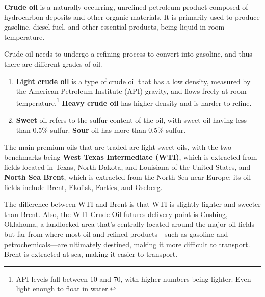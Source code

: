 \documentclass{article}
\begin{document}
      \begin{definition}
        \label{def:crude-oil}
        \textbf{Crude oil} is a naturally occurring, unrefined petroleum product composed of hydrocarbon deposits and other organic materials. It is primarily used to produce gasoline, diesel fuel, and other essential products, being liquid in room temperature. 

        Crude oil needs to undergo a refining process to convert into gasoline, and thus there are different grades of oil. 
        \begin{enumerate}
          \item \textbf{Light crude oil} is a type of crude oil that has a low density, measured by the American Petroleum Institute (API) gravity, and flows freely at room temperature.\footnote{API levels fall between 10 and 70, with higher numbers being lighter. Even light enough to float in water. } \textbf{Heavy crude oil} has higher density and is harder to refine. 
          \item \textbf{Sweet} oil refers to the sulfur content of the oil, with sweet oil having less than 0.5\% sulfur. \textbf{Sour} oil has more than 0.5\% sulfur. 
        \end{enumerate}
        The main premium oils that are traded are light sweet oils, with the two benchmarks being \textbf{West Texas Intermediate (WTI)}, which is extracted from fields located in Texas, North Dakota, and Louisiana of the United States, and \textbf{North Sea Brent}, which is extracted from the North Sea near Europe; its oil fields include Brent, Ekofisk, Forties, and Oseberg. 
      \end{definition}

      The difference between WTI and Brent is that WTI is slightly lighter and sweeter than Brent. Also, the WTI Crude Oil futures delivery point is Cushing, Oklahoma, a landlocked area that's centrally located around the major oil fields but far from where most oil and refined products—such as gasoline and petrochemicals—are ultimately destined, making it more difficult to transport. Brent is extracted at sea, making it easier to transport.
\end{document}
